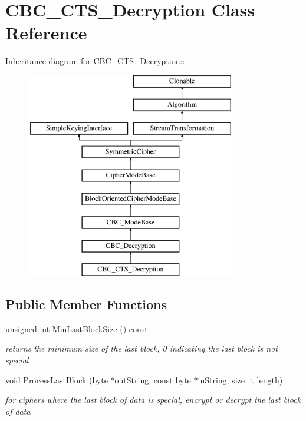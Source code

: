 \hypertarget{class_c_b_c___c_t_s___decryption}{
\section{CBC\_\-CTS\_\-Decryption Class Reference}
\label{class_c_b_c___c_t_s___decryption}
}
Inheritance diagram for CBC\_\-CTS\_\-Decryption::\begin{figure}[H]
\begin{center}
\leavevmode
\includegraphics[height=9cm]{class_c_b_c___c_t_s___decryption}
\end{center}
\end{figure}
\subsection*{Public Member Functions}
\begin{DoxyCompactItemize}
\item 
\hypertarget{class_c_b_c___c_t_s___decryption_aad1121b9d712a62b288bc7a1da0f31c4}{
unsigned int \hyperlink{class_c_b_c___c_t_s___decryption_aad1121b9d712a62b288bc7a1da0f31c4}{MinLastBlockSize} () const }
\label{class_c_b_c___c_t_s___decryption_aad1121b9d712a62b288bc7a1da0f31c4}

\begin{DoxyCompactList}\small\item\em returns the minimum size of the last block, 0 indicating the last block is not special \item\end{DoxyCompactList}\item 
void \hyperlink{class_c_b_c___c_t_s___decryption_a2f23aad280dc56920f16ea0711b39d89}{ProcessLastBlock} (byte $\ast$outString, const byte $\ast$inString, size\_\-t length)
\begin{DoxyCompactList}\small\item\em for ciphers where the last block of data is special, encrypt or decrypt the last block of data \item\end{DoxyCompactList}\end{DoxyCompactItemize}


